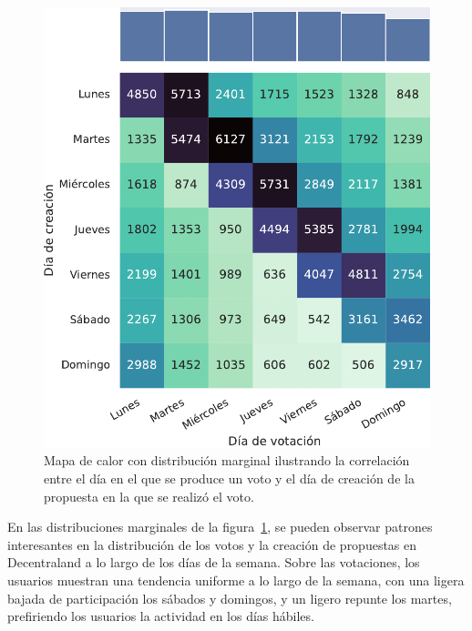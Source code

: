 \begin{figure}[p]
    \centering
    \includegraphics[scale=.8]{figures/04_exploracion/04c_heatmap_proposals_Decentraland.pdf}
    \caption[Mapa de calor día de voto y fecha de creación propuesta.]{Mapa de calor con distribución marginal ilustrando la correlación entre el día en el que se produce un voto y el día de creación de la propuesta en la que se realizó el voto.}
    \label{fig:heatmap-propuestas}
\end{figure}

En las distribuciones marginales de la figura~\ref{fig:heatmap-propuestas}, se pueden observar patrones interesantes en la distribución de los votos y la creación de propuestas en Decentraland a lo largo de los días de la semana. Sobre las votaciones, los usuarios muestran una tendencia uniforme a lo largo de la semana, con una ligera bajada de participación los sábados y domingos, y un ligero repunte los martes, prefiriendo los usuarios la actividad en los días hábiles. %

